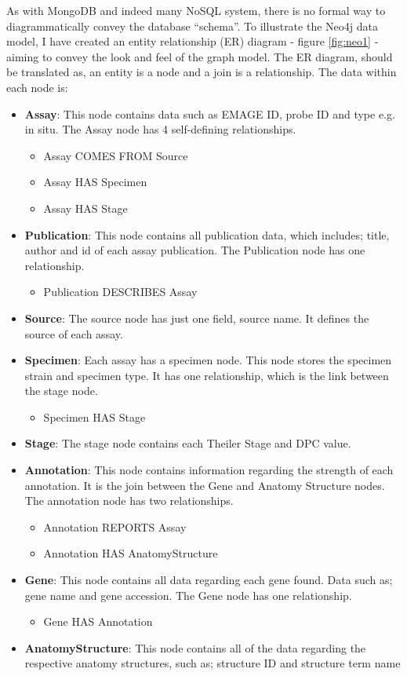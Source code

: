 As with MongoDB and indeed many NoSQL system, there is no formal way to diagrammatically convey the database ``schema''. To illustrate the Neo4j data model, I have created an entity relationship (ER) diagram - figure \ref{fig:neo1} - aiming to convey the look and feel of the graph model. The ER diagram, should be translated as, an entity is a node and a join is a relationship. The data within each node is:

\begin{itemize}
\item \textbf{Assay}: This node contains data such as EMAGE ID, probe ID and type e.g. in situ. The Assay node has 4 self-defining relationships.
\begin{itemize}
\item Assay COMES FROM Source
\item Assay HAS Specimen
\item Assay HAS Stage
\end{itemize}
\item \textbf{Publication}: This node contains all publication data, which includes; title, author and id of each assay publication. The Publication node has one relationship.
\begin{itemize}
\item Publication DESCRIBES Assay
\end{itemize}
\item \textbf{Source}: The source node has just one field, source name. It defines the source of each assay.
\item \textbf{Specimen}: Each assay has a specimen node. This node stores the specimen strain and specimen type. It has one relationship, which is the link between the stage node.
\begin{itemize}
\item Specimen HAS Stage
\end{itemize}
\item \textbf{Stage}: The stage node contains each Theiler Stage and DPC value.
\item \textbf{Annotation}: This node contains information regarding the strength of each annotation. It is the join between the Gene and Anatomy Structure nodes. The annotation node has two relationships.
\begin{itemize}
\item Annotation REPORTS Assay
\item Annotation HAS AnatomyStructure
\end{itemize}
\item \textbf{Gene}: This node contains all data regarding each gene found. Data such as; gene name and gene accession. The Gene node has one relationship.
\begin{itemize}
\item Gene HAS Annotation
\end{itemize}
\item \textbf{AnatomyStructure}: This node contains all of the data regarding the respective anatomy structures, such as; structure ID and structure term name
\end{itemize}

